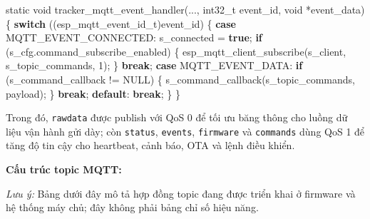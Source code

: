\documentclass[a4paper]{extarticle}
\newenvironment{Shaded}{}{}
\newcommand{\ControlFlowTok}[1]{\textcolor[rgb]{0.00,0.44,0.13}{\textbf{#1}}}
\newcommand{\DataTypeTok}[1]{\textcolor[rgb]{0.56,0.13,0.00}{#1}}
\newcommand{\DecValTok}[1]{\textcolor[rgb]{0.25,0.63,0.44}{#1}}
\newcommand{\KeywordTok}[1]{\textcolor[rgb]{0.00,0.44,0.13}{\textbf{#1}}}
\newcommand{\NormalTok}[1]{#1}
\newcommand{\OperatorTok}[1]{\textcolor[rgb]{0.40,0.40,0.40}{#1}}
\begin{document}
\begin{Shaded}
\begin{Highlighting}[]
\DataTypeTok{static} \DataTypeTok{void}\NormalTok{ tracker\_mqtt\_event\_handler}\OperatorTok{(...,} \DataTypeTok{int32\_t}\NormalTok{ event\_id}\OperatorTok{,} \DataTypeTok{void} \OperatorTok{*}\NormalTok{event\_data}\OperatorTok{)} \OperatorTok{\{}
    \ControlFlowTok{switch} \OperatorTok{((}\NormalTok{esp\_mqtt\_event\_id\_t}\OperatorTok{)}\NormalTok{event\_id}\OperatorTok{)} \OperatorTok{\{}
        \ControlFlowTok{case}\NormalTok{ MQTT\_EVENT\_CONNECTED}\OperatorTok{:}
\NormalTok{            s\_connected }\OperatorTok{=} \KeywordTok{true}\OperatorTok{;}
            \ControlFlowTok{if} \OperatorTok{(}\NormalTok{s\_cfg}\OperatorTok{.}\NormalTok{command\_subscribe\_enabled}\OperatorTok{)} \OperatorTok{\{}
\NormalTok{                esp\_mqtt\_client\_subscribe}\OperatorTok{(}\NormalTok{s\_client}\OperatorTok{,}\NormalTok{ s\_topic\_commands}\OperatorTok{,} \DecValTok{1}\OperatorTok{);}
            \OperatorTok{\}}
            \ControlFlowTok{break}\OperatorTok{;}
        \ControlFlowTok{case}\NormalTok{ MQTT\_EVENT\_DATA}\OperatorTok{:}
            \ControlFlowTok{if} \OperatorTok{(}\NormalTok{s\_command\_callback }\OperatorTok{!=}\NormalTok{ NULL}\OperatorTok{)} \OperatorTok{\{}
\NormalTok{                s\_command\_callback}\OperatorTok{(}\NormalTok{s\_topic\_commands}\OperatorTok{,}\NormalTok{ payload}\OperatorTok{);}
            \OperatorTok{\}}
            \ControlFlowTok{break}\OperatorTok{;}
        \ControlFlowTok{default}\OperatorTok{:}
            \ControlFlowTok{break}\OperatorTok{;}
    \OperatorTok{\}}
\OperatorTok{\}}
\end{Highlighting}
\end{Shaded}

Trong đó, \texttt{rawdata} được publish với QoS 0 để tối ưu băng thông
cho luồng dữ liệu vận hành gửi dày; còn \texttt{status}, \texttt{events},
\texttt{firmware} và \texttt{commands} dùng QoS 1 để tăng độ tin cậy cho
heartbeat, cảnh báo, OTA và lệnh điều khiển.

\textbf{Cấu trúc topic MQTT:}

\textit{Lưu ý:} Bảng dưới đây mô tả hợp đồng topic đang được triển khai ở
firmware và hệ thống máy chủ; đây không phải bảng chỉ số hiệu năng.
\end{document}
